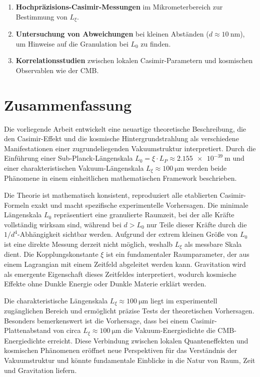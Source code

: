 \documentclass[12pt,a4paper]{article}
\begin{document}
	\begin{enumerate}
		\item \textbf{Hochpräzisions-Casimir-Messungen} im Mikrometerbereich zur Bestimmung von \( L_\xi \).
		\item \textbf{Untersuchung von Abweichungen} bei kleinen Abständen (\( d \approx \SI{10}{\nano\meter} \)), um Hinweise auf die Granulation bei \( L_0 \) zu finden.
		\item \textbf{Korrelationsstudien} zwischen lokalen Casimir-Parametern und kosmischen Observablen wie der CMB.
	\end{enumerate}
	
	\section{Zusammenfassung}
	
	Die vorliegende Arbeit entwickelt eine neuartige theoretische Beschreibung, die den Casimir-Effekt und die kosmische Hintergrundstrahlung als verschiedene Manifestationen einer zugrundeliegenden Vakuumstruktur interpretiert. Durch die Einführung einer Sub-Planck-Längenskala \( L_0 = \xi \cdot L_P \approx \SI{2.155e-39}{\meter} \) und einer charakteristischen Vakuum-Längenskala \( L_\xi \approx \SI{100}{\micro\meter} \) werden beide Phänomene in einem einheitlichen mathematischen Framework beschrieben.
	
	Die Theorie ist mathematisch konsistent, reproduziert alle etablierten Casimir-Formeln exakt und macht spezifische experimentelle Vorhersagen. Die minimale Längenskala \( L_0 \) repräsentiert eine granulierte Raumzeit, bei der alle Kräfte vollständig wirksam sind, während bei \( d > L_0 \) nur Teile dieser Kräfte durch die \( 1/d^4 \)-Abhängigkeit sichtbar werden. Aufgrund der extrem kleinen Größe von \( L_0 \) ist eine direkte Messung derzeit nicht möglich, weshalb \( L_\xi \) als messbare Skala dient. Die Kopplungskonstante \( \xi \) ist ein fundamentaler Raumparameter, der aus einem Lagrangian mit einem Zeitfeld abgeleitet werden kann. Gravitation wird als emergente Eigenschaft dieses Zeitfeldes interpretiert, wodurch kosmische Effekte ohne Dunkle Energie oder Dunkle Materie erklärt werden.
	
	Die charakteristische Längenskala \( L_\xi \approx \SI{100}{\micro\meter} \) liegt im experimentell zugänglichen Bereich und ermöglicht präzise Tests der theoretischen Vorhersagen. Besonders bemerkenswert ist die Vorhersage, dass bei einem Casimir-Plattenabstand von circa \( L_\xi \approx \SI{100}{\micro\meter} \) die Vakuum-Energiedichte die CMB-Energiedichte erreicht. Diese Verbindung zwischen lokalen Quanteneffekten und kosmischen Phänomenen eröffnet neue Perspektiven für das Verständnis der Vakuumstruktur und könnte fundamentale Einblicke in die Natur von Raum, Zeit und Gravitation liefern.
	
\end{document}
